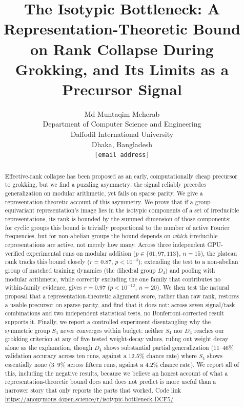 \documentclass{article}
\title{The Isotypic Bottleneck: A Representation-Theoretic Bound on Rank Collapse During Grokking, and Its Limits as a Precursor Signal}
\author{%
  Md Muntaqim Meherab \\
  Department of Computer Science and Engineering \\
  Daffodil International University \\
  Dhaka, Bangladesh \\
  \texttt{[email address]}
}
\begin{document}
\maketitle

\begin{abstract}
Effective-rank collapse has been proposed as an early, computationally cheap
precursor to grokking, but we find a puzzling asymmetry: the
signal reliably precedes generalization on modular arithmetic, yet fails on
sparse parity. We give a representation-theoretic account of this asymmetry.
We prove that if a group-equivariant representation's image lies in the
isotypic components of a set of irreducible representations, its rank is
bounded by the summed dimension of those components; for cyclic groups this
bound is trivially proportional to the number of active Fourier frequencies,
but for non-abelian groups the bound depends on \emph{which} irreducible
representations are active, not merely how many. Across three independent
GPU-verified
experimental runs on modular addition ($p \in \{61,97,113\}$, $n=15$), the
plateau rank tracks this bound closely ($r=0.87$, $p<10^{-4}$); extending the
test to a non-abelian group of matched training dynamics (the dihedral group
$D_4$) and pooling with modular arithmetic, while correctly excluding the one
family that contributes no within-family evidence, gives $r=0.97$
($p<10^{-12}$, $n=20$). We then test the natural proposal that a
representation-theoretic alignment score, rather than raw rank, restores a
usable precursor on sparse parity, and find that it does not: across seven
signal/task combinations and two independent statistical tests, no
Bonferroni-corrected result supports it. Finally, we report a controlled experiment
disentangling why the symmetric group $S_4$ never converges within budget:
neither $S_4$ nor $D_4$ reaches our grokking criterion at any of five tested
weight-decay values, ruling out weight decay alone as the explanation, though
$D_4$ shows substantial partial generalization ($11$--$46\%$ validation
accuracy across ten runs, against a $12.5\%$ chance rate) where $S_4$ shows
essentially none ($3$--$9\%$ across fifteen runs, against a $4.2\%$ chance
rate). We report all of this, including the negative results, because we
believe an honest account of what a representation-theoretic bound does and
does not predict is more useful than a narrower story that only reports the
parts that worked. Code link {\hypersetup{urlcolor=navy}\url{https://anonymous.4open.science/r/isotypic-bottleneck-DCF5/}}
\end{abstract}
\end{document}
